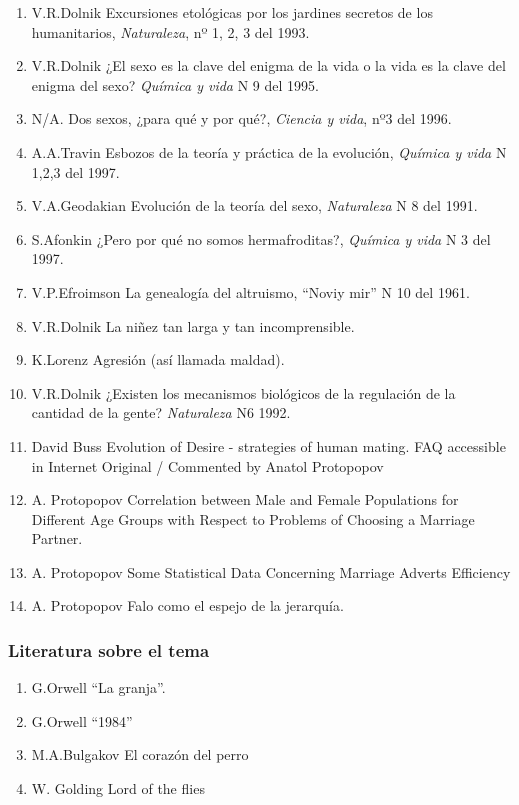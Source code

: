 \begin{enumerate}
\def\labelenumi{\arabic{enumi}.}
\item V.R.Dolnik Excursiones etológicas por los jardines secretos de los
  humanitarios, \emph{Naturaleza}, nº 1, 2, 3 del 1993.
\item V.R.Dolnik ¿El sexo es la clave del enigma de la vida o la vida es la
  clave del enigma del sexo? \emph{Química y vida} N 9 del 1995.
\item N/A. Dos sexos, ¿para qué y por qué?, \textit{Ciencia y vida}, nº3 del 1996.
\item A.A.Travin Esbozos de la teoría y práctica de la evolución, \emph{Química y vida} N 1,2,3 del 1997.
\item V.A.Geodakian Evolución de la teoría del sexo, \emph{Naturaleza} N 8
  del 1991.
\item S.Afonkin ¿Pero por qué no somos hermafroditas?, \emph{Química y vida}
  N 3 del 1997.
\item V.P.Efroimson La genealogía del altruismo, ``Noviy mir'' N 10 del 1961.
\item V.R.Dolnik La niñez tan larga y tan incomprensible.
\item K.Lorenz Agresión (así llamada maldad). %
\item V.R.Dolnik ¿Existen los mecanismos biológicos de la regulación de la cantidad de la gente? \emph{Naturaleza} N6 %
1992.
\item David Buss Evolution of Desire - strategies of human mating. FAQ
  accessible in Internet Original / Commented by Anatol Protopopov
\item A. Protopopov Correlation between Male and Female Populations for Different Age  Groups with Respect to Problems of Choosing a Marriage Partner.
\item A. Protopopov Some Statistical Data Concerning Marriage Adverts Efficiency
\item A. Protopopov Falo como el espejo de la jerarquía.
\end{enumerate}

\subsubsection{Literatura sobre el tema}\label{literatura-sobre-el-tema}

\begin{enumerate}
\def\labelenumi{\arabic{enumi}.}
\setcounter{enumi}{12}

\item  G.Orwell ``La granja''.
\item  G.Orwell ``1984''
\item  M.A.Bulgakov El corazón del perro
\item  W. Golding Lord of the flies
\end{enumerate}

